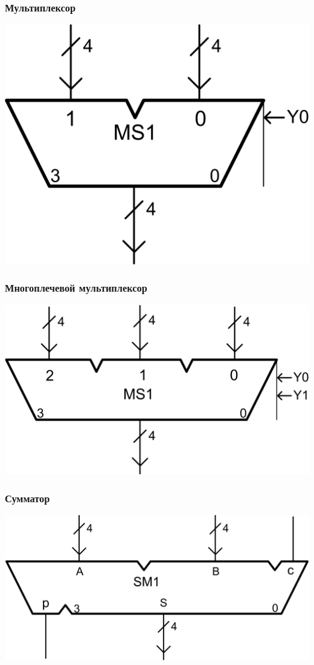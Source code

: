 \begin{frame}
    \frametitle{Мультиплексор}
    \begin{center}
        \includegraphics{fig/mux}
    \end{center}
\end{frame}

\begin{frame}
    \frametitle{Многоплечевой мультиплексор}
    \begin{center}
        \includegraphics{fig/muxbig}
    \end{center}
\end{frame}

\begin{frame}
    \frametitle{Сумматор}
    \begin{center}
        \includegraphics{fig/summator}
    \end{center}
\end{frame}

